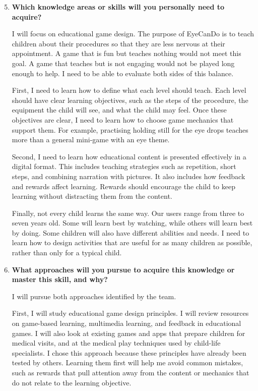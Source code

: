 \documentclass[10pt]{article}
\begin{document}
\begin{enumerate}
    \setcounter{enumi}{4}

    \item \textbf{Which knowledge areas or skills will you personally
    need to acquire?}

    I will focus on educational game design. The purpose of EyeCanDo
    is to teach children about their procedures so that they are less
    nervous at their appointment. A game that is fun but teaches
    nothing would not meet this goal. A game that teaches but is not
    engaging would not be played long enough to help. I need to be
    able to evaluate both sides of this balance.

    First, I need to learn how to define what each level should teach.
    Each level should have clear learning objectives, such as the steps
    of the procedure, the equipment the child will see, and what the
    child may feel. Once these objectives are clear, I need to learn
    how to choose game mechanics that support them. For example,
    practising holding still for the eye drops teaches more than a
    general mini-game with an eye theme.

    Second, I need to learn how educational content is presented
    effectively in a digital format. This includes teaching strategies
    such as repetition, short steps, and combining narration with
    pictures. It also includes how feedback and rewards affect
    learning. Rewards should encourage the child to keep learning
    without distracting them from the content.

    Finally, not every child learns the same way. Our users range from
    three to seven years old. Some will learn best by watching, while
    others will learn best by doing. Some children will also have
    different abilities and needs. I need to learn how to design
    activities that are useful for as many children as possible,
    rather than only for a typical child.

    \item \textbf{What approaches will you pursue to acquire this
    knowledge or master this skill, and why?}

    I will pursue both approaches identified by the team.

    First, I will study educational game design principles. I will
    review resources on game-based learning, multimedia learning, and
    feedback in educational games. I will also look at existing games
    and apps that prepare children for medical visits, and at the
    medical play techniques used by child-life specialists. I chose
    this approach because these principles have already been tested
    by others. Learning them first will help me avoid common mistakes,
    such as rewards that pull attention away from the content or
    mechanics that do not relate to the learning objective.


\end{enumerate}
\end{document}
